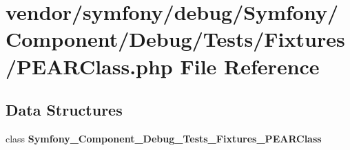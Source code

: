 \section{vendor/symfony/debug/\+Symfony/\+Component/\+Debug/\+Tests/\+Fixtures/\+P\+E\+A\+R\+Class.php File Reference}
\label{_p_e_a_r_class_8php}
\subsection*{Data Structures}
\begin{DoxyCompactItemize}
\item 
class {\bf Symfony\+\_\+\+Component\+\_\+\+Debug\+\_\+\+Tests\+\_\+\+Fixtures\+\_\+\+P\+E\+A\+R\+Class}
\end{DoxyCompactItemize}
